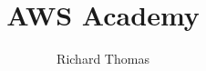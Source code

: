 \documentclass{csse4400}
\title{AWS Academy}
\author{Richard Thomas}
\date{\week{1}}
\begin{document}
\makecover


\end{document}
